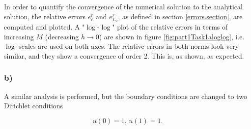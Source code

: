 In order to quantify the convergence of the numerical solution to the analytical solution, the relative errors $e_\ell^r$ and $e_{L_2}^r$, as defined in section \ref{errors.section}, are computed and plotted. 
A "$\log$-$\log$" plot of the relative errors in terms of increasing $M$ (decreasing $h \rightarrow 0$) are shown in figure \ref{fig:part1Task1aloglog}, i.e. $\log$-scales are used on both axes. The relative errors in both norms look very similar, and they show a convergence of order 2. This is, as shown, as expected. 
\newpage
\subsubsection{b)}    

A similar analysis is performed, but the boundary conditions are changed to two Dirichlet conditions

\begin{equation*}
    u(0) = 1, \, u(1) = 1.
\end{equation*}

